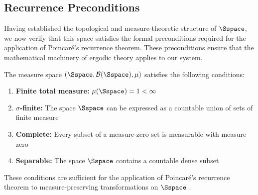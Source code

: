 \subsection{Recurrence Preconditions}

Having established the topological and measure-theoretic structure of $\Sspace$, we now verify that this space satisfies the formal preconditions required for the application of Poincaré's recurrence theorem. These preconditions ensure that the mathematical machinery of ergodic theory applies to our system.

\begin{theorem}
\label{thm:recurrence_preconditions}
The measure space $(\Sspace, \mathcal{B}(\Sspace), \mu)$ satisfies the following conditions:
\begin{enumerate}[label=(\roman*)]
    \item \textbf{Finite total measure:} $\mu(\Sspace) = 1 < \infty$
    \item \textbf{$\sigma$-finite:} The space $\Sspace$ can be expressed as a countable union of sets of finite measure
    \item \textbf{Complete:} Every subset of a measure-zero set is measurable with measure zero
    \item \textbf{Separable:} The space $\Sspace$ contains a countable dense subset
\end{enumerate}
These conditions are sufficient for the application of Poincaré's recurrence theorem to measure-preserving transformations on $\Sspace$ \citep{poincare1890probleme, halmos1956lectures}.
\end{theorem}


